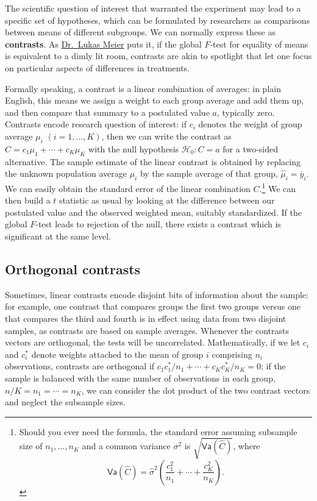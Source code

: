 \documentclass[
  11pt,
  letterpaper,
]{scrbook}
\theoremstyle{definition}
\theoremstyle{definition}
\theoremstyle{remark}
\begin{document}
The scientific question of interest that warranted the experiment may
lead to a specific set of hypotheses, which can be formulated by
researchers as comparisons between means of different subgroups. We can
normally express these as \textbf{contrasts}. As
\href{https://stat.ethz.ch/~meier}{Dr.~Lukas Meier} puts it, if the
global \(F\)-test for equality of means is equivalent to a dimly lit
room, contrasts are akin to spotlight that let one focus on particular
aspects of differences in treatments.

Formally speaking, a contrast is a linear combination of averages: in
plain English, this means we assign a weight to each group average and
add them up, and then compare that summary to a postulated value \(a\),
typically zero. Contrasts encode research question of interest: if
\(c_i\) denotes the weight of group average \(\mu_i\)
\((i=1, \ldots, K)\), then we can write the contrast as
\(C = c_1 \mu_1 + \cdots + c_K \mu_K\) with the null hypothesis
\(\mathscr{H}_0: C=a\) for a two-sided alternative. The sample estimate
of the linear contrast is obtained by replacing the unknown population
average \(\mu_i\) by the sample average of that group,
\(\widehat{\mu}_i = \overline{y}_{i}\). We can easily obtain the
standard error of the linear combination \(C.\)\footnote{Should you ever
  need the formula, the standard error assuming subsample size of
  \(n_1, \ldots, n_K\) and a common variance \(\sigma^2\) is
  \(\sqrt{\mathsf{Va}(\widehat{C})}\), where
  \[\mathsf{Va}(\widehat{C}) = \widehat{\sigma}^2\left(\frac{c_1^2}{n_1} + \cdots + \frac{c_K^2}{n_K}\right).\]}
We can then build a \(t\) statistic as usual by looking at the
difference between our postulated value and the observed weighted mean,
suitably standardized. If the global \(F\)-test leads to rejection of
the null, there exists a contrast which is significant at the same
level.

\subsection{Orthogonal contrasts}\label{orthogonal-contrasts}

Sometimes, linear contrasts encode disjoint bits of information about
the sample: for example, one contrast that compares groups the first two
groups versus one that compares the third and fourth is in effect using
data from two disjoint samples, as contrasts are based on sample
averages. Whenever the contrasts vectors are orthogonal, the tests will
be uncorrelated. Mathematically, if we let \(c_{i}\) and \(c^{*}_{i}\)
denote weights attached to the mean of group \(i\) comprising \(n_i\)
observations, contrasts are orthogonal if
\(c_{1}c^{*}_{1}/n_1 + \cdots + c_{K}c^{*}_K/n_K = 0\); if the sample is
balanced with the same number of observations in each group,
\(n/K = n_1 =\cdots = n_K\), we can consider the dot product of the two
contrast vectors and neglect the subsample sizes.
\end{document}
